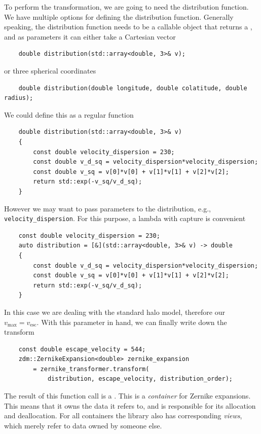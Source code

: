 \documentclass{article}
\begin{document}
To perform the transformation, we are going to need the distribution function. We have multiple options for defining the distribution function. Generally speaking, the distribution function needs to be a callable object that returns a , and as parameters it can either take a Cartesian vector
\begin{verbatim}
    double distribution(std::array<double, 3>& v);
\end{verbatim}
or three spherical coordinates
\begin{verbatim}
    double distribution(double longitude, double colatitude, double radius);
\end{verbatim}
We could define this as a regular function
\begin{verbatim}
    double distribution(std::array<double, 3>& v)
    {
        const double velocity_dispersion = 230;
        const double v_d_sq = velocity_dispersion*velocity_dispersion;
        const double v_sq = v[0]*v[0] + v[1]*v[1] + v[2]*v[2];
        return std::exp(-v_sq/v_d_sq);
    }
\end{verbatim}
However we may want to pass parameters to the distribution, e.g., \texttt{velocity\_dispersion}. For this purpose, a lambda with capture is convenient
\begin{verbatim}
    const double velocity_dispersion = 230;
    auto distribution = [&](std::array<double, 3>& v) -> double
    {
        const double v_d_sq = velocity_dispersion*velocity_dispersion;
        const double v_sq = v[0]*v[0] + v[1]*v[1] + v[2]*v[2];
        return std::exp(-v_sq/v_d_sq);
    }
\end{verbatim}

In this case we are dealing with the standard halo model, therefore our $v_\text{max}=v_\text{esc}$. With this parameter in hand, we can finally write down the transform
\begin{verbatim}
    const double escape_velocity = 544;
    zdm::ZernikeExpansion<double> zernike_expansion
        = zernike_transformer.transform(
            distribution, escape_velocity, distribution_order);
\end{verbatim}
The result of this function call is a . This is a \emph{container} for Zernike expansions. This means that it owns the data it refers to, and is responsible for its allocation and deallocation. For all containers the library also has corresponding \emph{views}, which merely refer to data owned by someone else.
\end{document}
